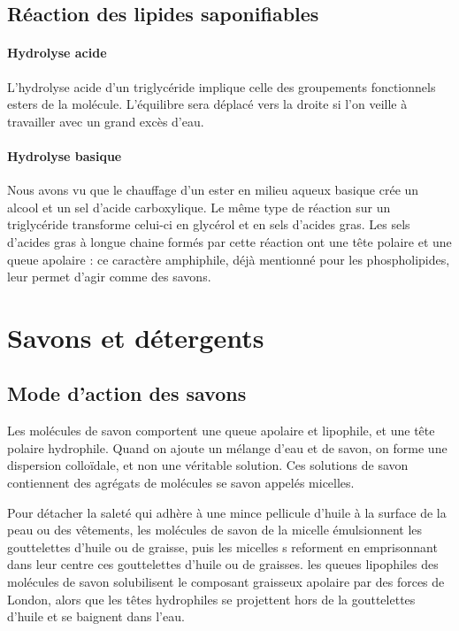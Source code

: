 \subsection{Réaction des lipides saponifiables}

\paragraph{Hydrolyse acide}

L'hydrolyse acide d'un triglycéride implique celle des groupements fonctionnels esters de la molécule.
L'équilibre sera déplacé vers la droite si l'on veille à travailler avec un grand excès d'eau.

\paragraph{Hydrolyse basique}
Nous avons vu que le chauffage d'un ester en milieu aqueux basique crée un alcool et un sel d'acide carboxylique.
Le même type de réaction sur un triglycéride transforme celui-ci en glycérol et en sels d'acides gras.
Les sels d'acides gras à longue chaine formés par cette réaction ont une tête polaire et une queue apolaire : ce caractère amphiphile, déjà mentionné pour les phospholipides, leur permet d'agir comme des savons.

\section{Savons et détergents}

\subsection{Mode d'action des savons}
Les molécules de savon comportent une queue apolaire et lipophile, et une tête polaire hydrophile.
Quand on ajoute un mélange d'eau et de savon, on forme une dispersion colloïdale, et non une véritable solution.
Ces solutions de savon contiennent des agrégats de molécules se savon appelés micelles.

Pour détacher la saleté qui adhère à une mince pellicule d'huile à la surface de la peau ou des vêtements, les molécules de savon de la micelle émulsionnent les gouttelettes d'huile ou de graisse, puis les micelles s reforment en emprisonnant dans leur centre ces gouttelettes d'huile  ou de graisses.
les queues lipophiles des molécules de savon solubilisent le composant graisseux apolaire par des forces de London, alors que les têtes hydrophiles se projettent hors de la gouttelettes d'huile et se baignent dans l'eau.

